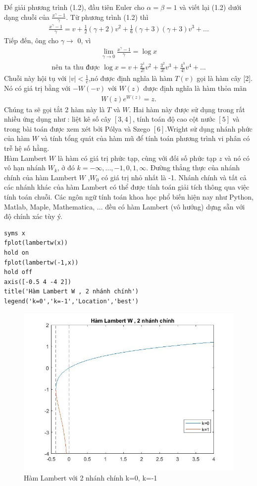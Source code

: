 	Để giải phương trình (1.2), đầu tiên Euler cho $\alpha = \beta = 1$ và viết lại (1.2) dưới dạng chuỗi của $\frac{x^{\gamma}-1}{\gamma}$. Từ phương trình (1.2) thì 
		\begin{align*}
			\frac{x^{\gamma}-1}{\gamma} = v + \frac{1}{2}(\gamma+2)v^{2} + \frac{1}{6}(\gamma+3)(\gamma+3)v^{3} + ... 
		\end{align*}
		Tiếp đến, ông cho $\gamma \rightarrow$ 0, vì \begin{align*} \displaystyle \lim_{\gamma \to 0}\frac{x^{\gamma}-1}{\gamma} = \log x 
		\end{align*}
		\begin{align} \mbox{nên ta thu được }\log x = v + \frac{2^{1}}{2!}v^{2} + \frac{3^{2}}{3!}v^{3} + \frac{4^3}{4!}v^{4} + ... 
		\end{align}
		Chuỗi này hội tụ với $|v| < \frac{1}{e}$,nó được định nghĩa là hàm $T(v)$ gọi là hàm cây [2]. Nó có giá trị bằng với $-W(-v)$ với $W(z)$ được định nghĩa là hàm thỏa mãn 
		\begin{align}
			W(z)e^{W(z)} = z.
		\end{align} 
		Chúng ta sẽ gọi tắt 2 hàm này là $T$ và $W$. Hai hàm này được sử dụng trong rất nhiều ứng dụng như : liệt kê số cây $[3,4]$, tính toán độ cao cột nước $[5]$ và trong bài toán được xem xét bởi Pólya và Szego $[6]$.Wright sử dụng nhánh phức của hàm $W$ và tính tổng quát của hàm mũ để tính toán phương trình vi phân có trễ hệ số hằng.\\
		Hàm Lambert $W$ là hàm có giá trị phức tạp, cùng với đối số phức tạp $z$ và nó có vô hạn nhánh $W_{k}$, ở đó $k = -\infty, ..., -1, 0 , 1, \infty$. Đường thẳng thực của nhánh chính của hàm Lambert $W$ ,$W_{0}$ có giá trị nhỏ nhất là -1. Nhánh chính và tất cả các nhánh khác của hàm Lambert có thể được tính toán giải tích thông qua việc tính toán chuỗi. Các ngôn ngữ tính toán khoa học phổ biến hiện nay như Python, Matlab, Maple, Mathematica, ... đều có hàm Lambert (vô hướng) dựng sẵn với độ chính xác tùy ý.
\begin{verbatim}
syms x
fplot(lambertw(x))
hold on
fplot(lambertw(-1,x))
hold off
axis([-0.5 4 -4 2])
title('Hàm Lambert W , 2 nhánh chính')
legend('k=0','k=-1','Location','best')
\end{verbatim}
\begin{figure}
    \includegraphics[scale=0.5]{wfig.jpg}
    \caption{Hàm Lambert với 2 nhánh chính k=0, k=-1}
\end{figure}

